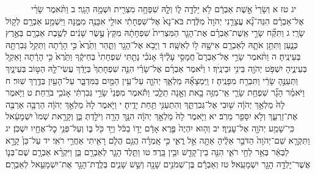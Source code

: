 \documentclass[twoside, openany, parskip=half, 11pt]{book}
\begin{document}
　　　יג טז א וְשָׂרַי֙ אֵ֣שֶׁת אַבְרָ֔ם לֹ֥א יָלְדָ֖ה ל֑וֹ וְלָ֛הּ שִׁפְחָ֥ה מִצְרִ֖ית וּשְׁמָ֥הּ הָגָֽר׃ ב וַתֹּ֨אמֶר שָׂרַ֜י אֶל־אַבְרָ֗ם הִנֵּה־נָ֞א עֲצָרַ֤נִי יְהֹוָה֙ מִלֶּ֔דֶת בֹּא־נָא֙ אֶל־שִׁפְחָתִ֔י אוּלַ֥י אִבָּנֶ֖ה מִמֶּ֑נָּה וַיִּשְׁמַ֥ע אַבְרָ֖ם לְק֥וֹל שָׂרָֽי׃ ג וַתִּקַּ֞ח שָׂרַ֣י אֵֽשֶׁת־אַבְרָ֗ם אֶת־הָגָ֤ר הַמִּצְרִית֙ שִׁפְחָתָ֔הּ מִקֵּץ֙ עֶ֣שֶׂר שָׁנִ֔ים לְשֶׁ֥בֶת אַבְרָ֖ם בְּאֶ֣רֶץ כְּנָ֑עַן וַתִּתֵּ֥ן אֹתָ֛הּ לְאַבְרָ֥ם אִישָׁ֖הּ ל֥וֹ לְאִשָּֽׁה׃ ד וַיָּבֹ֥א אֶל־הָגָ֖ר וַתַּ֑הַר וַתֵּ֙רֶא֙ כִּ֣י הָרָ֔תָה וַתֵּקַ֥ל גְּבִרְתָּ֖הּ בְּעֵינֶֽיהָ׃ ה וַתֹּ֨אמֶר שָׂרַ֣י אֶל־אַבְרָם֮ חֲמָסִ֣י עָלֶ֒יךָ֒ אָנֹכִ֗י נָתַ֤תִּי שִׁפְחָתִי֙ בְּחֵיקֶ֔ךָ וַתֵּ֙רֶא֙ כִּ֣י הָרָ֔תָה וָאֵקַ֖ל בְּעֵינֶ֑יהָ יִשְׁפֹּ֥ט יְהֹוָ֖ה בֵּינִ֥י וּבֵינֶֽיׄךָ׃ ו וַיֹּ֨אמֶר אַבְרָ֜ם אֶל־שָׂרַ֗י הִנֵּ֤ה שִׁפְחָתֵךְ֙ בְּיָדֵ֔ךְ עֲשִׂי־לָ֖הּ הַטּ֣וֹב בְּעֵינָ֑יִךְ וַתְּעַנֶּ֣הָ שָׂרַ֔י וַתִּבְרַ֖ח מִפָּנֶֽיהָ׃ ז וַֽיִּמְצָאָ֞הּ מַלְאַ֧ךְ יְהֹוָ֛ה עַל־עֵ֥ין הַמַּ֖יִם בַּמִּדְבָּ֑ר עַל־הָעַ֖יִן בְּדֶ֥רֶךְ שֽׁוּר׃ ח וַיֹּאמַ֗ר הָגָ֞ר שִׁפְחַ֥ת שָׂרַ֛י אֵֽי־מִזֶּ֥ה בָ֖את וְאָ֣נָה תֵלֵ֑כִי וַתֹּ֕אמֶר מִפְּנֵי֙ שָׂרַ֣י גְּבִרְתִּ֔י אָנֹכִ֖י בֹּרַֽחַת׃ ט וַיֹּ֤אמֶר לָהּ֙ מַלְאַ֣ךְ יְהֹוָ֔ה שׁ֖וּבִי אֶל־גְּבִרְתֵּ֑ךְ וְהִתְעַנִּ֖י תַּ֥חַת יָדֶֽיהָ׃ י וַיֹּ֤אמֶר לָהּ֙ מַלְאַ֣ךְ יְהֹוָ֔ה הַרְבָּ֥ה אַרְבֶּ֖ה אֶת־זַרְעֵ֑ךְ וְלֹ֥א יִסָּפֵ֖ר מֵרֹֽב׃ יא וַיֹּ֤אמֶר לָהּ֙ מַלְאַ֣ךְ יְהֹוָ֔ה הִנָּ֥ךְ הָרָ֖ה וְיֹלַ֣דְתְּ בֵּ֑ן וְקָרָ֤את שְׁמוֹ֙ יִשְׁמָעֵ֔אל כִּֽי־שָׁמַ֥ע יְהֹוָ֖ה אֶל־עׇנְיֵֽךְ׃ יב וְה֤וּא יִהְיֶה֙ פֶּ֣רֶא אָדָ֔ם יָד֣וֹ בַכֹּ֔ל וְיַ֥ד כֹּ֖ל בּ֑וֹ וְעַל־פְּנֵ֥י כׇל־אֶחָ֖יו יִשְׁכֹּֽן׃ יג וַתִּקְרָ֤א שֵׁם־יְהֹוָה֙ הַדֹּבֵ֣ר אֵלֶ֔יהָ אַתָּ֖ה אֵ֣ל רֳאִ֑י כִּ֣י אָֽמְרָ֗ה הֲגַ֥ם הֲלֹ֛ם רָאִ֖יתִי אַחֲרֵ֥י רֹאִֽי׃ יד עַל־כֵּן֙ קָרָ֣א לַבְּאֵ֔ר בְּאֵ֥ר לַחַ֖י רֹאִ֑י הִנֵּ֥ה בֵין־קָדֵ֖שׁ וּבֵ֥ין בָּֽרֶד׃ טו וַתֵּ֧לֶד הָגָ֛ר לְאַבְרָ֖ם בֵּ֑ן וַיִּקְרָ֨א אַבְרָ֧ם שֶׁם־בְּנ֛וֹ אֲשֶׁר־יָלְדָ֥ה הָגָ֖ר יִשְׁמָעֵֽאל׃ טז וְאַבְרָ֕ם בֶּן־שְׁמֹנִ֥ים שָׁנָ֖ה וְשֵׁ֣שׁ שָׁנִ֑ים בְּלֶֽדֶת־הָגָ֥ר אֶת־יִשְׁמָעֵ֖אל לְאַבְרָֽם׃
\end{document}
